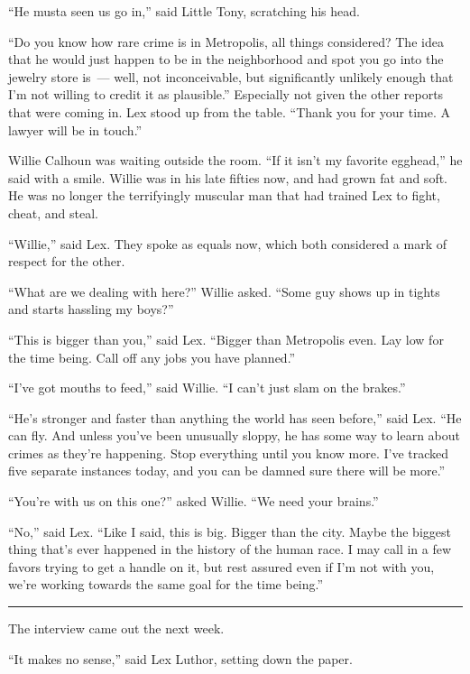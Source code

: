 \documentclass[ebook,12pt]{memoir}
\begin{document}
``He musta seen us go in,'' said Little Tony, scratching his head.

``Do you know how rare crime is in Metropolis, all things considered?
The idea that he would just happen to be in the neighborhood and spot
you go into the jewelry store is~--- well, not inconceivable, but
significantly unlikely enough that I'm not willing to credit it as
plausible.'' Especially not given the other reports that were coming in.
Lex stood up from the table. ``Thank you for your time. A lawyer will be
in touch.''

Willie Calhoun was waiting outside the room. ``If it isn't my favorite
egghead,'' he said with a smile. Willie was in his late fifties now, and
had grown fat and soft. He was no longer the terrifyingly muscular man
that had trained Lex to fight, cheat, and steal.

``Willie,'' said Lex. They spoke as equals now, which both considered a
mark of respect for the other.

``What are we dealing with here?'' Willie asked. ``Some guy shows up in
tights and starts hassling my boys?''

``This is bigger than you,'' said Lex. ``Bigger than Metropolis even.
Lay low for the time being. Call off any jobs you have planned.''

``I've got mouths to feed,'' said Willie. ``I can't just slam on the
brakes.''

``He's stronger and faster than anything the world has seen before,''
said Lex. ``He can fly. And unless you've been unusually sloppy, he has
some way to learn about crimes as they're happening. Stop everything
until you know more. I've tracked five separate instances today, and you
can be damned sure there will be more.''

``You're with us on this one?'' asked Willie. ``We need your brains.''

``No,'' said Lex. ``Like I said, this is big. Bigger than the city.
Maybe the biggest thing that's ever happened in the history of the human
race. I may call in a few favors trying to get a handle on it, but rest
assured even if I'm not with you, we're working towards the same goal
for the time being.''

\begin{center}\rule{0.5\linewidth}{\linethickness}\end{center}

The interview came out the next week.

``It makes no sense,'' said Lex Luthor, setting down the paper.
\end{document}
